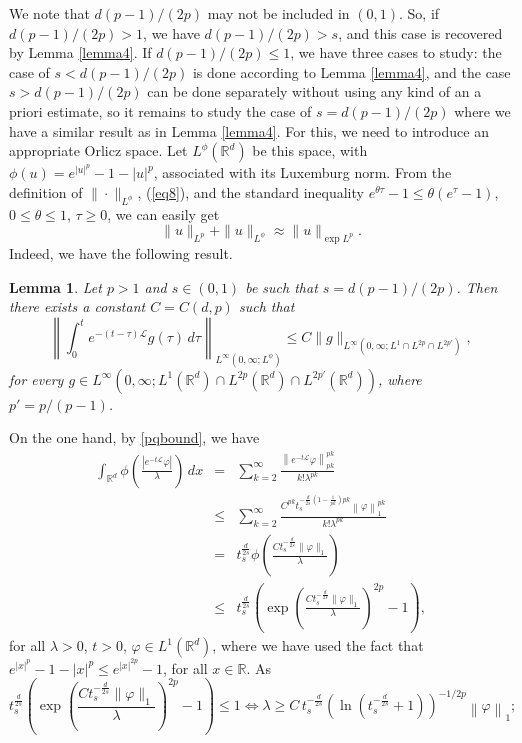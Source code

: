 \documentclass[a4paper,11pt]{amsart}
\numberwithin{equation}{section}
\theoremstyle{plain}
\newtheorem{lemma}[theorem]{Lemma}
\theoremstyle{definition}
\begin{document}
We note that $d(p-1)/(2 p)$ may not be included in $(0,1)$. So, if $d(p-1)/(2 p)>1$, we have $d(p-1)/(2 p)>s$, and this case is recovered by Lemma \ref{lemma4}. If $d(p-1)/(2 p)\leq1$, we have three cases to study: the case of $s<d(p-1)/(2 p)$ is done according to Lemma \ref{lemma4}, and the case $s >d(p-1)/(2 p)$ can be done separately without using any kind of an a priori estimate, so it remains to study the case of $s=d(p-1)/(2 p)$ where we have a similar result as in Lemma \ref{lemma4}.  For this, we need to introduce an appropriate Orlicz space. Let $L^\phi(\mathbb{R}^d)$ be this space, with $\phi(u)=e^{|u|^p}-1-|u|^p$, associated with its Luxemburg norm. From the definition of $\|\cdotp\|_{L^\phi}$, (\ref{eq8}), and the standard inequality $e^{\theta \tau}-1\leq\theta(e^\tau-1)$, $0\leq\theta\leq1$, $\tau\geq 0$, we can easily get
\begin{equation}\label{eq0}
 \|u\|_{L^p}+\|u\|_{L^\phi}  \approx  \|u\|_{\exp L^p}.
\end{equation}
Indeed, we have the following result.
\begin{lemma}${}$\label{lemma5}
Let $p>1$ and $s\in(0,1)$ be such that $s=d(p-1)/(2 p)$. Then there exists a constant $C=C(d,p)$ such that
 $$\left\|\int_0^te^{-(t-\tau)\mathcal{L}} g(\tau)\,d\tau\right\|_{L^\infty(0,\infty;L^\phi)}\leq C\|g\|_{L^\infty(0,\infty;L^1\cap L^{2p}\cap L^{2p'})},$$ 
for every $g\in L^\infty(0,\infty;L^1(\mathbb{R}^d)\cap L^{2p}(\mathbb{R}^d)\cap L^{2p'}(\mathbb{R}^d))$, where $p'=p/(p-1)$.
\end{lemma}
\proof On the one hand, by \ref{pqbound}, we have
\begin{eqnarray*}
\int_{\mathbb{R}^d}\phi\left(\frac{|e^{-t\mathcal{L}} \varphi|}{\lambda}\right)\,dx&=&\sum_{k=2}^{\infty}\frac{\left\|e^{-t\mathcal
L} \varphi\right\|_{pk}^{pk}}{k!\lambda^{pk}}\\
&\leq& \sum_{k=2}^{\infty}\frac{C^{pk}t_s^{-\frac{d}{2 s}(1-\frac{1}{pk})pk}\left\|\varphi\right\|_{1}^{pk}}{k!\lambda^{pk}}\\&=&t_s^{\frac{d}{2 s}}\phi\left(\frac{C t_s^{-\frac{d}{2 s}}\|\varphi\|_1}{\lambda}\right)\\
&\leq& t_s^{\frac{d}{2 s}}\left(\exp\left(\frac{C t_s^{-\frac{d}{2 s}}\|\varphi\|_1}{\lambda}\right)^{2p}-1\right),
\end{eqnarray*}
for all $\lambda>0$, $t>0$, $\varphi\in L^1(\mathbb{R}^d)$, where we have used the fact that $e^{|x|^p}-1-|x|^p\leq e^{|x|^{2p}}-1$, for all $x\in\mathbb{R}$. As
$$ t_s^{\frac{d}{2 s}}\left(\exp\left(\frac{C t_s^{-\frac{d}{2 s}}\|\varphi\|_1}{\lambda}\right)^{2p}-1\right)\leq 1\Longleftrightarrow \lambda\geq C\,t_s^{-\frac{d}{2 s}}\left(\ln( t_s^{-\frac{d}{2 s}}+1)\right)^{-1/2p}\left\|\varphi\right\|_{1};$$
\end{document}
